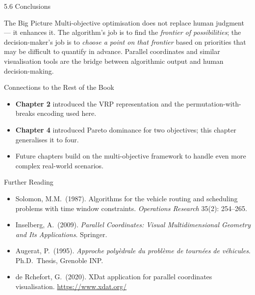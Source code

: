 \documentclass[aspectratio=169,10pt]{beamer}
\begin{document}
\begin{frame}[allowframebreaks]{5.6 Conclusions}
  \begin{alertblock}{The Big Picture}
    Multi-objective optimisation does not replace human judgment — it
    enhances it.  The algorithm's job is to find the \emph{frontier of
    possibilities}; the decision-maker's job is to \emph{choose a point on
    that frontier} based on priorities that may be difficult to quantify
    in advance.  Parallel coordinates and similar visualisation tools are
    the bridge between algorithmic output and human decision-making.
  \end{alertblock}

\framebreak

  \begin{block}{Connections to the Rest of the Book}
    \begin{itemize}
      \item \textbf{Chapter 2} introduced the VRP representation and the
            permutation-with-breaks encoding used here.
      \item \textbf{Chapter 4} introduced Pareto dominance for two
            objectives; this chapter generalises it to four.
      \item Future chapters build on the multi-objective framework to
            handle even more complex real-world scenarios.
    \end{itemize}
  \end{block}

  \begin{block}{Further Reading}
    \begin{itemize}
      \item Solomon, M.M.\ (1987). Algorithms for the vehicle routing and
            scheduling problems with time window constraints.
            \textit{Operations Research} 35(2): 254--265.
      \item Inselberg, A.\ (2009). \textit{Parallel Coordinates: Visual
            Multidimensional Geometry and Its Applications}.
            Springer.
      \item Augerat, P.\ (1995). \textit{Approche polyèdrale du problème
            de tournées de véhicules}.  Ph.D.\ Thesis, Grenoble INP.
      \item de Rchefort, G.\ (2020). XDat application for parallel
            coordinates visualisation. \url{https://www.xdat.org/}
    \end{itemize}
  \end{block}

\end{frame}
\end{document}
